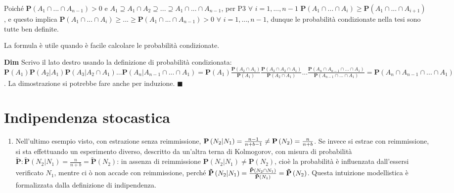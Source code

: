 \documentclass{article}
\begin{document}
Poich\'{e} $\mathbf{P}\left( A_{1}\cap ...\cap A_{n-1}\right) >0$ e $%
A_{1}\supseteq A_{1}\cap A_{2}\supseteq ...\supseteq A_{1}\cap ...\cap
A_{n-1}$, per P3 $\forall $ $i=1,...,n-1$ $\mathbf{P}\left( A_{1}\cap
...\cap A_{i}\right) \geq \mathbf{P}\left( A_{1}\cap ...\cap A_{i+1}\right) $%
, e questo implica $\mathbf{P}\left( A_{1}\cap ...\cap A_{i}\right) \geq
...\geq \mathbf{P}\left( A_{1}\cap ...\cap A_{n-1}\right) >0$ $\forall $ $%
i=1,...,n-1$, dunque le probabilit\`{a} condizionate nella tesi sono tutte
ben definite.

La formula \`{e} utile quando \`{e} facile calcolare le probabilit\`{a}
condizionate.

\textbf{Dim} Scrivo il lato destro usando la definizione di probabilit\`{a}
condizionata: $\mathbf{P}\left( A_{1}\right) \mathbf{P}\left(
A_{2}|A_{1}\right) \mathbf{P}\left( A_{3}|A_{2}\cap A_{1}\right) ...\mathbf{P%
}\left( A_{n}|A_{n-1}\cap ...\cap A_{1}\right) =\mathbf{P}\left(
A_{1}\right) \frac{\mathbf{P}\left( A_{2}\cap A_{1}\right) }{\mathbf{P}%
\left( A_{1}\right) }\frac{\mathbf{P}\left( A_{3}\cap A_{2}\cap A_{1}\right) 
}{\mathbf{P}\left( A_{2}\cap A_{1}\right) }...\frac{\mathbf{P}\left(
A_{n}\cap A_{n-1}\cap ...\cap A_{1}\right) }{\mathbf{P}\left( A_{n-1}\cap
...\cap A_{1}\right) }=\mathbf{P}\left( A_{n}\cap A_{n-1}\cap ...\cap
A_{1}\right) $. La dimostrazione si potrebbe fare anche per induzione. $%
\blacksquare $

\section{Indipendenza stocastica}

\begin{enumerate}
\item Nell'ultimo esempio visto, con estrazione senza reimmissione, $\mathbf{%
P}\left( N_{2}|N_{1}\right) =\frac{n-1}{n+b-1}\neq \mathbf{P}\left(
N_{2}\right) =\frac{n}{n+b}$. Se invece si estrae con reimmissione, si sta
effettuando un esperimento diverso, descritto da un'altra terna di
Kolmogorov, con misura di probabilit\`{a} $\mathbf{\tilde{P}:\tilde{P}}%
\left( N_{2}|N_{1}\right) =\frac{n}{n+b}=\mathbf{\tilde{P}}\left(
N_{2}\right) $: in assenza di reimmissione $\mathbf{P}\left(
N_{2}|N_{1}\right) \neq \mathbf{P}\left( N_{2}\right) $, cio\`{e} la
probabilit\`{a} \`{e} influenzata dall'essersi verificato $N_{1}$, mentre ci%
\`{o} non accade con reimmissione, perch\'{e} $\mathbf{\tilde{P}}\left(
N_{2}|N_{1}\right) =\frac{\mathbf{\tilde{P}}\left( N_{2}\cap N_{1}\right) }{%
\mathbf{\tilde{P}}\left( N_{1}\right) }=\mathbf{\tilde{P}}\left(
N_{2}\right) $. Questa intuizione modellistica \`{e} formalizzata dalla
definizione di indipendenza.
\end{enumerate}
\end{document}
